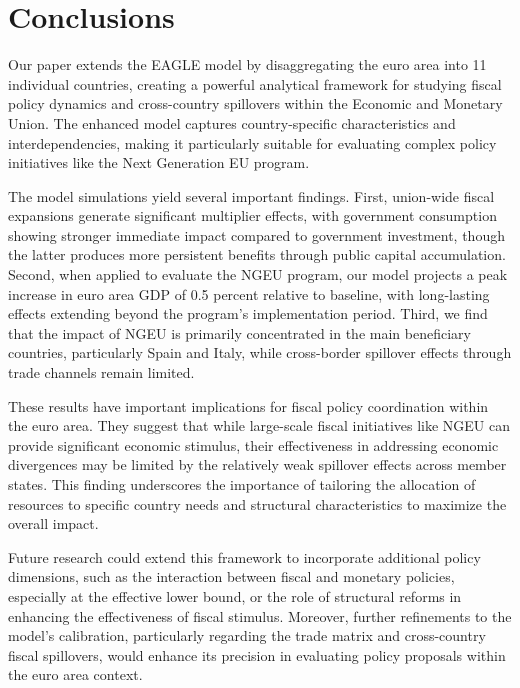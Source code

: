 \documentclass[a4paper,11pt]{article}
\numberwithin{equation}{section}
\begin{document}
\section{Conclusions}

Our paper extends the EAGLE model by disaggregating the euro area into 11 individual countries, creating a powerful analytical framework for studying fiscal policy dynamics and cross-country spillovers within the Economic and Monetary Union.
The enhanced model captures country-specific characteristics and interdependencies, making it particularly suitable for evaluating complex policy initiatives like the Next Generation EU program.

The model simulations yield several important findings.
First, union-wide fiscal expansions generate significant multiplier effects, with government consumption showing stronger immediate impact compared to government investment, though the latter produces more persistent benefits through public capital accumulation.
Second, when applied to evaluate the NGEU program, our model projects a peak increase in euro area GDP of 0.5 percent relative to baseline, with long-lasting effects extending beyond the program's implementation period.
Third, we find that the impact of NGEU is primarily concentrated in the main beneficiary countries, particularly Spain and Italy, while cross-border spillover effects through trade channels remain limited.

These results have important implications for fiscal policy coordination within the euro area.
They suggest that while large-scale fiscal initiatives like NGEU can provide significant economic stimulus, their effectiveness in addressing economic divergences may be limited by the relatively weak spillover effects across member states.
This finding underscores the importance of tailoring the allocation of resources to specific country needs and structural characteristics to maximize the overall impact.

Future research could extend this framework to incorporate additional policy dimensions, such as the interaction between fiscal and monetary policies, especially at the effective lower bound, or the role of structural reforms in enhancing the effectiveness of fiscal stimulus.
Moreover, further refinements to the model's calibration, particularly regarding the trade matrix and cross-country fiscal spillovers, would enhance its precision in evaluating policy proposals within the euro area context.
\end{document}
